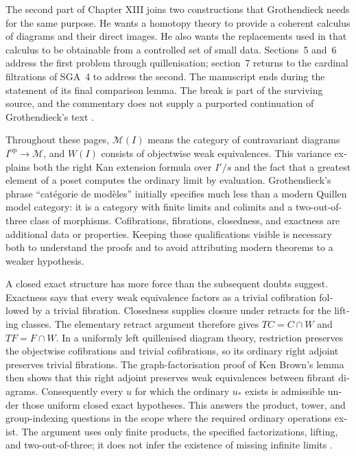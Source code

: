 \begin{otherlanguage}{english}

The second part of Chapter XIII joins two constructions that Grothendieck needs for the same purpose. He wants a homotopy theory to provide a coherent calculus of diagrams and their direct images. He also wants the replacements used in that calculus to be obtainable from a controlled set of small data. Sections~5 and~6 address the first problem through quillenisation; section~7 returns to the cardinal filtrations of SGA~4 to address the second. The manuscript ends during the statement of its final comparison lemma. The break is part of the surviving source, and the commentary does not supply a purported continuation of Grothendieck's text \citep{GrothendieckDerivateursXIII}.

Throughout these pages, $\mathcal M(I)$ means the category of contravariant diagrams $I^{\mathrm{op}}\to\mathcal M$, and $W(I)$ consists of objectwise weak equivalences. This variance explains both the right Kan extension formula over $I'/s$ and the fact that a greatest element of a poset computes the ordinary limit by evaluation. Grothendieck's phrase ``cat\'egorie de mod\`eles'' initially specifies much less than a modern Quillen model category: it is a category with finite limits and colimits and a two-out-of-three class of morphisms. Cofibrations, fibrations, closedness, and exactness are additional data or properties. Keeping those qualifications visible is necessary both to understand the proofs and to avoid attributing modern theorems to a weaker hypothesis.

A closed exact structure has more force than the subsequent doubts suggest. Exactness says that every weak equivalence factors as a trivial cofibration followed by a trivial fibration. Closedness supplies closure under retracts for the lifting classes. The elementary retract argument therefore gives $TC=C\cap W$ and $TF=F\cap W$. In a uniformly left quillenised diagram theory, restriction preserves the objectwise cofibrations and trivial cofibrations, so its ordinary right adjoint preserves trivial fibrations. The graph-factorisation proof of Ken Brown's lemma then shows that this right adjoint preserves weak equivalences between fibrant diagrams. Consequently every $u$ for which the ordinary $u_*$ exists is admissible under those uniform closed exact hypotheses. This answers the product, tower, and group-indexing questions in the scope where the required ordinary operations exist. The argument uses only finite products, the specified factorizations, lifting, and two-out-of-three; it does not infer the existence of missing infinite limits \citep[Lemmas~1.1.9 and~1.1.12]{Hovey1999}.


\end{otherlanguage}
